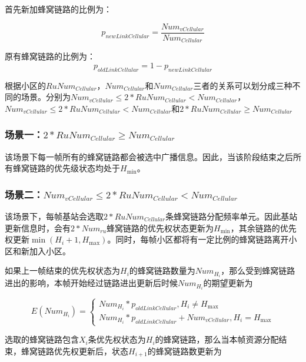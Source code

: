 \documentclass[figurelist,tablelist,algorithmlist,nomlist,masters]{seuthesix}
\begin{document}
	首先新加蜂窝链路的比例为：
	
	\begin{equation}\label{eq3.1}
	{p_{newLinkCellular}} = \frac{{Nu{m_{vCellular}}}}{{Nu{m_{Cellular}}}}
	\end{equation}
	
	原有蜂窝链路的比例为：
	\begin{equation}\label{eq3.1}
	{p_{oldLinkCellular}} = 1 - {p_{newLinkCellular}}
	\end{equation}
	
	根据小区的$RuNu{m_{Cellular}}$，$Nu{m_{Cellular}}$和$Nu{m_{Cellular}}$三者的关系可以划分成三种不同的场景。分别为$Nu{m_{vCellular}} \le 2*RuNu{m_{Cellular}} < Nu{m_{Cellular}}$，$Nu{m_{vCellular}} \le 2*RuNu{m_{Cellular}} < Nu{m_{Cellular}}$和$2*RuNu{m_{Cellular}} \ge Nu{m_{Cellular}}$
	
	\subsubsection{场景一：$2*RuNu{m_{Cellular}} \ge Nu{m_{Cellular}}$}
	该场景下每一帧所有的蜂窝链路都会被选中广播信息。因此，当该阶段结束之后所有蜂窝链路的优先级状态均处于${H_{\min }}$。
	
	\subsubsection{场景二：$Nu{m_{vCellular}} \le 2*RuNu{m_{Cellular}} < Nu{m_{Cellular}}$}
	该场景下，每帧基站会选取$2*RuNu{m_{Cellular}}$条蜂窝链路分配频率单元。因此基站更新信息时，会有$2*Nu{m_{ru}}$蜂窝链路的优先权状态更新为${H_{\min }}$，其余链路的优先权更新$\min ({H_i} + 1,{H_{\max }})$。同时，每帧小区都将有一定比例的蜂窝链路离开小区和新加入小区。
	
	如果上一帧结束的优先权状态为${H_i}$的蜂窝链路数量为$Nu{m_{{H_i}}}$，那么受到蜂窝链路进出的影响，本帧开始经过链路进出更新后时候$Nu{m_{{H_i}}}$的期望更新为
	
	\begin{equation}\label{eq3.1}
	E(Nu{m_{{H_i}}}) = \left\{ \begin{array}{l}
	Nu{m_{{H_i}}}*{p_{oldLinkCellular}},{H_i} \ne {H_{\max }}\\
	Nu{m_{{H_i}}}*{p_{oldLinkCellular}} + Nu{m_{vCellular}},{H_i} = {H_{\max }}
	\end{array} \right.
	\end{equation}
	
	选取的蜂窝链路包含${X_i}$条优先权状态为${H_i}$的蜂窝链路，那么当本帧资源分配结束，蜂窝链路优先权更新后，状态${H_{i + 1}}$的蜂窝链路数更新为
	
\end{document}
